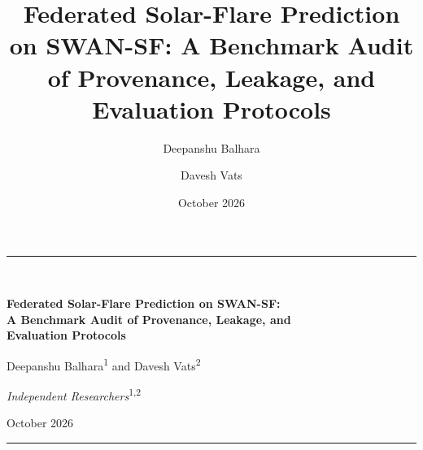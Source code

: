 \documentclass[11pt,a4paper]{article}
\title{Federated Solar-Flare Prediction on SWAN-SF: A Benchmark Audit
of Provenance, Leakage, and Evaluation Protocols}
\author{Deepanshu Balhara \and Davesh Vats}
\date{October 2026}
\begin{document}
\thispagestyle{plain}

\begin{center}
    {\color{black!85}\rule{\textwidth}{0.4pt}}\\[2.2em]
    {\LARGE\bfseries Federated Solar-Flare Prediction on SWAN-SF:\\[0.35em]
     A Benchmark Audit of Provenance, Leakage, and\\[0.15em]
     Evaluation Protocols\par}
    \vspace{1.6em}
    {\large Deepanshu Balhara\textsuperscript{1} \quad and \quad
     Davesh Vats\textsuperscript{2}\par}
    \vspace{0.7em}
    {\small\textit{Independent Researchers}\textsuperscript{1,2}\par}
    \vspace{1.1em}
    {\small October 2026\par}
    \vspace{1.4em}
    {\color{black!85}\rule{\textwidth}{0.4pt}}
\end{center}

\vspace{0.4em}
\end{document}

